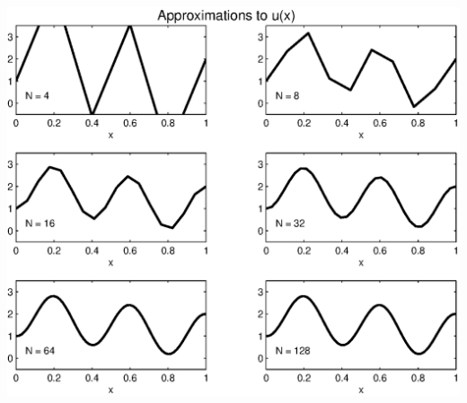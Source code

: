 \begin{solution}
\begin{enumerate}
\begin{center}
\includegraphics[scale=0.7]{separate_d}
\end{center}

\end{enumerate}
\end{solution}
